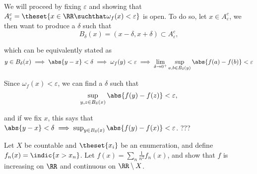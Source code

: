 \begin{solution}
\begin{enumerate}
  We will proceed by fixing $\varepsilon$ and showing that $A_\varepsilon^c = \theset{x\in \RR \suchthat \omega_f(x) < \varepsilon}$ is open. To do so, let $x\in A_\varepsilon^c$, we then want to produce a $\delta$ such that
  $$
  B_\delta(x) = (x-\delta, x+\delta) \subset A_\varepsilon^c,
  $$

  which can be equivalently stated as
  $$
  y\in B_\delta(x) \implies \abs{y - x} < \delta \implies
  \omega_f(y) < \varepsilon \implies
  \lim_{\delta\to 0^+} \sup_{a,b \in B_\delta(y)}\abs{f(a) - f(b)} < \varepsilon
  $$

  Since $\omega_f(x) < \varepsilon$, we can find a $\delta$ such that
  $$
  \sup_{y,z \in B_{\delta}(x)} \abs{f(y) - f(z)} < \varepsilon,
  $$

  and if we fix $x$, this says that $\abs{y - x} < \delta \implies \sup_{y \in B_\delta(x)} \abs{f(y) - f(x)} < \varepsilon$. ???
\end{enumerate}
\end{solution}

\begin{problem}
  Let $X$ be countable and $\theset{x_i}$ be an enumeration, and define $f_n(x) = \indic{x > x_n}$. Let $f(x) = \sum_n \frac 1 {n^2} f_n(x)$, and show that $f$ is increasing on $\RR$ and continuous on $\RR\setminus X$.
\end{problem}

